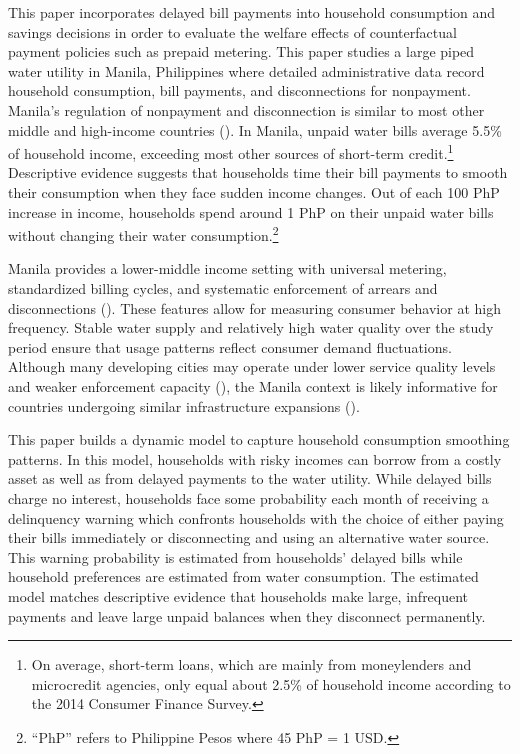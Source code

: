 \documentclass[12pt]{article}
\begin{document}
This paper incorporates delayed bill payments into household consumption and savings decisions in order to evaluate the welfare effects of counterfactual payment policies such as prepaid metering.  This paper studies a large piped water utility in Manila, Philippines where detailed administrative data record household consumption, bill payments, and disconnections for nonpayment.  Manila's regulation of nonpayment and disconnection is similar to most other middle and high-income countries (\cite{marques2023water}).  In Manila, unpaid water bills average 5.5\% of household income, exceeding most other sources of short-term credit.\footnote{On average, short-term loans, which are mainly from moneylenders and microcredit agencies, only equal about 2.5\% of household income according to the 2014 Consumer Finance Survey.}  Descriptive evidence suggests that households time their bill payments to smooth their consumption when they face sudden income changes.  Out of each 100 PhP increase in income, households spend around 1 PhP on their unpaid water bills without changing their water consumption.\footnote{``PhP'' refers to Philippine Pesos where 45 PhP = 1 USD.}

Manila provides a lower-middle income setting with universal metering, standardized billing cycles, and systematic enforcement of arrears and disconnections (\cite{wu2008tale}).  These features allow for measuring consumer behavior at high frequency.  Stable water supply and relatively high water quality over the study period ensure that usage patterns reflect consumer demand fluctuations.  Although many developing cities may operate under lower service quality levels and weaker enforcement capacity (\cite{kingdom2006challenge}), the Manila context is likely informative for countries undergoing similar infrastructure expansions (\cite{WEF2025WaterGap}).

This paper builds a dynamic model to capture household consumption smoothing patterns.  In this model, households with risky incomes can borrow from a costly asset as well as from delayed payments to the water utility.  While delayed bills charge no interest, households face some probability each month of receiving a delinquency warning which confronts households with the choice of either paying their bills immediately or disconnecting and using an alternative water source.  This warning probability is estimated from households' delayed bills while household preferences are estimated from water consumption.  The estimated model matches descriptive evidence that households make large, infrequent payments and leave large unpaid balances when they disconnect permanently.
\end{document}
